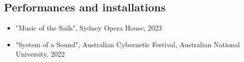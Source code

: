 \subsection*{Performances and installations}

\begin{itemize}
    \item "Music of the Sails", Sydney Opera House, 2023
    \item "System of a Sound", Australian Cybernetic Festival, Australian National University, 2022
\end{itemize}




